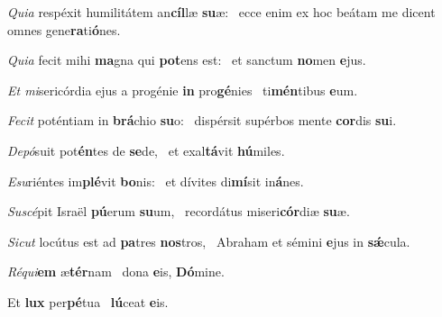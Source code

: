 \item \textit{Quia} respéxit humilitátem an\textbf{cíl}læ \textbf{su}æ:~\psstar{} ecce enim ex hoc beátam me dicent omnes gene\textbf{ra}ti\textbf{ó}nes.

\item \textit{Quia} fecit mihi \textbf{ma}gna qui \textbf{pot}ens est:~\psstar{} et sanctum \textbf{no}men \textbf{e}jus.

\item \textit{Et mi}sericórdia ejus a progénie \textbf{in} pro\textbf{gé}nies~\psstar{} ti\textbf{mén}tibus \textbf{e}um.

\item \textit{Fecit} poténtiam in \textbf{brá}chio \textbf{su}o:~\psstar{} dispérsit supérbos mente \textbf{cor}dis \textbf{su}i.

\item \textit{Depó}suit pot\textbf{én}tes de \textbf{se}de,~\psstar{} et exal\textbf{tá}vit \textbf{hú}miles.

\item \textit{Esu}riéntes im\textbf{plé}vit \textbf{bo}nis:~\psstar{} et dívites di\textbf{mí}sit in\textbf{á}nes.

\item \textit{Suscé}pit Israël \textbf{pú}erum \textbf{su}um,~\psstar{} recordátus miseri\textbf{cór}diæ \textbf{su}æ.

\item \textit{Sicut} locútus est ad \textbf{pa}tres \textbf{nos}tros,~\psstar{} Abraham et sémini \textbf{e}jus in \textbf{sǽ}cula.

\item \textit{Réqui}\textbf{em} æ\textbf{tér}nam~\psstar{} dona \textbf{e}is, \textbf{Dó}mine.

\item Et \textbf{lux} per\textbf{pé}tua~\psstar{} \textbf{lú}ceat \textbf{e}is.